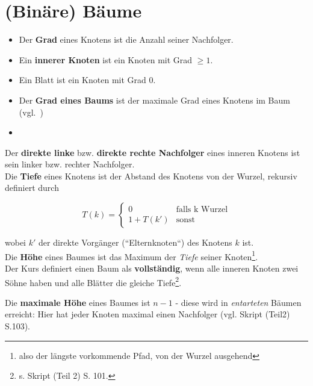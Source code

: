 \section{(Binäre) Bäume}


\begin{itemize}
    \item Der \textbf{Grad} eines Knotens ist die Anzahl seiner Nachfolger.
    \item Ein \textbf{innerer Knoten} ist ein Knoten mit Grad $\geq 1$.
    \item Ein Blatt ist ein Knoten mit Grad $0$.
    \item Der \textbf{Grad eines Baums} ist der maximale Grad eines Knotens im Baum (vgl.~\cite[102]{GD18c})

\item \end{itemize}


\noindent
Der \textbf{direkte linke} bzw. \textbf{direkte rechte Nachfolger} eines inneren Knotens ist sein linker bzw. rechter Nachfolger.\\

\noindent
Die \textbf{Tiefe} eines Knotens ist der Abstand des Knotens von der Wurzel, rekursiv definiert durch

\begin{equation}
    T(k) = \begin{cases}
            0 &\text{falls k Wurzel}\\
            1 + T(k') &\text{sonst}
    \end{cases}
\end{equation}

wobei $k'$ der direkte Vorgänger (``Elternknoten``) des Knotens $k$ ist.\\

\noindent
Die \textbf{Höhe} eines Baumes ist das Maximum der \textit{Tiefe} seiner Knoten\footnote{also der längste vorkommende Pfad,  von der Wurzel ausgehend}.\\

\noindent
Der Kurs definiert einen Baum als \textbf{vollständig}, wenn alle inneren Knoten zwei Söhne haben und alle Blätter die gleiche Tiefe\footnote{
    s. Skript (Teil 2) S. 101.
}.

\noindent
Die \textbf{maximale Höhe} eines Baumes ist $n - 1$ - diese wird in \textit{entarteten} Bäumen erreicht: Hier hat jeder Knoten maximal einen Nachfolger (vgl. Skript (Teil2) S.103).\\

